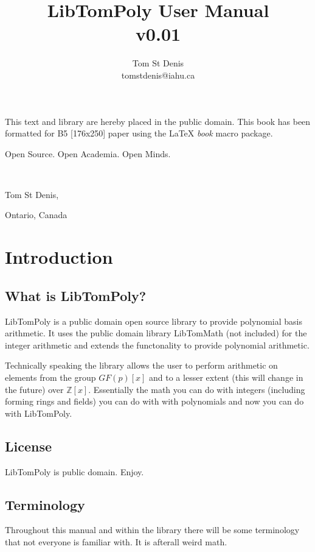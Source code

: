\documentclass[b5paper]{book}
\def\Z{{\mathbb Z}}
\begin{document}
\frontmatter
\pagestyle{empty}
\title{LibTomPoly User Manual \\ v0.01}
\author{Tom St Denis \\ tomstdenis@iahu.ca}
\maketitle
This text and library are  hereby placed in the public domain.  This book has been 
formatted for B5 [176x250] paper using the \LaTeX{} {\em book} macro package.

\vspace{10cm}

\begin{flushright}Open Source.  Open Academia.  Open Minds.

\mbox{ }

Tom St Denis,

Ontario, Canada
\end{flushright}

\tableofcontents
\listoffigures
\mainmatter
\pagestyle{headings}
\chapter{Introduction}
\section{What is LibTomPoly?}
LibTomPoly is a public domain open source library to provide polynomial basis arithmetic.  It uses the public domain
library LibTomMath (not included) for the integer arithmetic and extends the functonality to provide polynomial arithmetic.

Technically speaking the library allows the user to perform arithmetic on elements from the group $GF(p)[x]$ and to 
a lesser extent (this will change in the future) over $\Z[x]$.  Essentially the math you can do with integers (including
forming rings and fields) you can do with with polynomials and now you can do with LibTomPoly.

\section{License}
LibTomPoly is public domain.  Enjoy.

\section{Terminology}
Throughout this manual and within the library there will be some terminology that not everyone is familiar with.  It is afterall
weird math.
\end{document}
